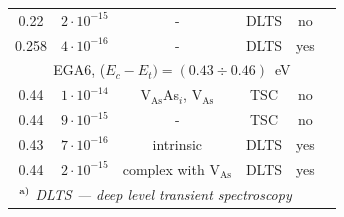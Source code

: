 \documentclass[final,3p,times,twocolumn,authoryear]{elsarticle}
\begin{document}
\begin{table}
\begin{minipage}{1.85\textwidth}
\begin{tabular}{cccccc}
0.22&$2\cdot10^{-15}$&-&DLTS&no&\cite{Fang:EL6}\\ %
0.258&$4\cdot10^{-16}$&-&DLTS&yes&\cite{Yousefi1995}\\ %
\multicolumn{6}{c}{EGA6, ($E_c-E_t)=(0.43\div0.46)$~eV}\\
0.44&$1\cdot10^{-14}$&V$_\mathrm{As}$As$_i$, V$_\mathrm{As}$&TSC&no&\cite{Pavlovic2000}\\ %
0.44&$9\cdot10^{-15}$&-&TSC&no&\cite{Pavlovic:GaAs}\\ %
\multirow{2}{*}{0.43}&\multirow{2}{*}{$7\cdot10^{-16}$}&\multirow{2}{*}{intrinsic}&\multirow{2}{*}{DLTS}&\multirow{2}{*}{yes}&\cite{Lefevre1977}\\
&&&&&\cite{Bourgoin:GaAs}\\
0.44&$2\cdot10^{-15}$&complex with V$_\mathrm{As}$&DLTS&yes&\cite{KolFTP1989En}\\ %
\multicolumn{6}{l}{$\textsuperscript{ a)}$ \emph{DLTS --- deep level transient spectroscopy}}\\
\hline
\end{tabular}
\end{minipage}
\end{table}

\cite{KolFTP1994En}

\cite{Samoilov1994En}

\cite{VaitkusEn}

\cite{KolFTP1989En}

\cite{Konakova2007JTFEn}

\cite{BoltovetsEn,Konakova2012FTPEn}

\cite{Bacherikov2003En,Pashkov1994En,BoltovetsEn,Milenin1994En,BelyaevIntac}

\cite{ZOHM2000}

\cite{FANG1990}

\cite{OstrovskiiSST,OlikhSSC,OstrovPAN}

\cite{BoltovetsEn,Konakova2012FTPEn}

\cite{Yousefi1995,Mircea1975,Bourgoin:GaAs,ASHBY:GaAs,Fang:EL6,Lefevre1977,KolFTP1989En}
\end{document}
